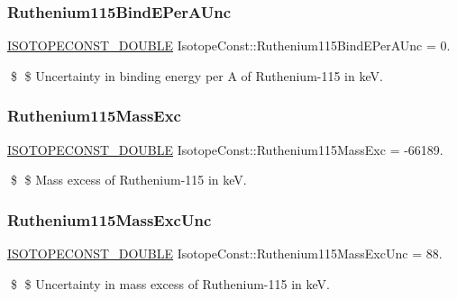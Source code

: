 \subsubsection{\texorpdfstring{Ruthenium115\+Bind\+E\+Per\+A\+Unc}{Ruthenium115BindEPerAUnc}}
{\footnotesize\ttfamily \mbox{\hyperlink{group___isotope_const-_macros_ga8f45a7272ce02c0b4c65c44636ed719a}{I\+S\+O\+T\+O\+P\+E\+C\+O\+N\+S\+T\+\_\+\+D\+O\+U\+B\+LE}} Isotope\+Const\+::\+Ruthenium115\+Bind\+E\+Per\+A\+Unc = 0.}

\$ \$ Uncertainty in binding energy per A of Ruthenium-\/115 in keV. \mbox{\label{group___isotope_const-_ruthenium-_ru115_ga3eb57f449612b26ffb7ff085789e7dd9}} 
\subsubsection{\texorpdfstring{Ruthenium115\+Mass\+Exc}{Ruthenium115MassExc}}
{\footnotesize\ttfamily \mbox{\hyperlink{group___isotope_const-_macros_ga8f45a7272ce02c0b4c65c44636ed719a}{I\+S\+O\+T\+O\+P\+E\+C\+O\+N\+S\+T\+\_\+\+D\+O\+U\+B\+LE}} Isotope\+Const\+::\+Ruthenium115\+Mass\+Exc = -\/66189.}

\$ \$ Mass excess of Ruthenium-\/115 in keV. \mbox{\label{group___isotope_const-_ruthenium-_ru115_ga62426c5f6260a790faaca5146d3e1e94}} 
\subsubsection{\texorpdfstring{Ruthenium115\+Mass\+Exc\+Unc}{Ruthenium115MassExcUnc}}
{\footnotesize\ttfamily \mbox{\hyperlink{group___isotope_const-_macros_ga8f45a7272ce02c0b4c65c44636ed719a}{I\+S\+O\+T\+O\+P\+E\+C\+O\+N\+S\+T\+\_\+\+D\+O\+U\+B\+LE}} Isotope\+Const\+::\+Ruthenium115\+Mass\+Exc\+Unc = 88.}

\$ \$ Uncertainty in mass excess of Ruthenium-\/115 in keV. \mbox{\label{group___isotope_const-_ruthenium-_ru115_gad93bea7b089c5273dc01eb625f927c8d}} 
